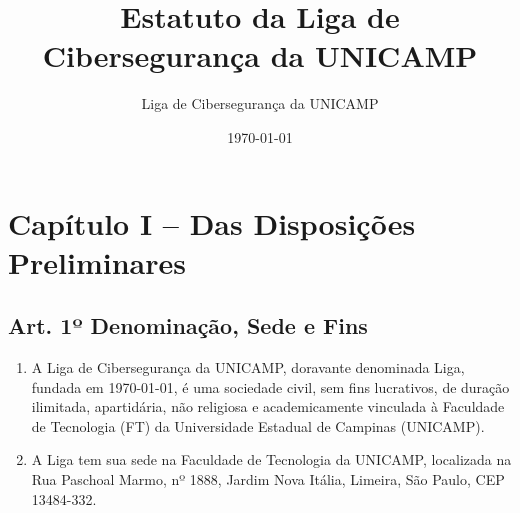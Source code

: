 \documentclass[12pt, a4paper]{article}
\title{Estatuto da Liga de Cibersegurança da UNICAMP}
\author{Liga de Cibersegurança da UNICAMP}
\date{\today}
\begin{document}
\maketitle
\thispagestyle{empty}
\newpage

\tableofcontents
\newpage

\section{Capítulo I – Das Disposições Preliminares}


\subsection{Art. 1º Denominação, Sede e Fins}
\begin{enumerate}[label=\S \arabic*.]
    \item A Liga de Cibersegurança da UNICAMP, doravante denominada Liga, fundada em \today, é uma sociedade civil, sem fins lucrativos, de duração ilimitada, apartidária, não religiosa e academicamente vinculada à Faculdade de Tecnologia (FT) da Universidade Estadual de Campinas (UNICAMP).
    \item A Liga tem sua sede na Faculdade de Tecnologia da UNICAMP, localizada na Rua Paschoal Marmo, nº 1888, Jardim Nova Itália, Limeira, São Paulo, CEP 13484-332.
\end{enumerate}
\end{document}
